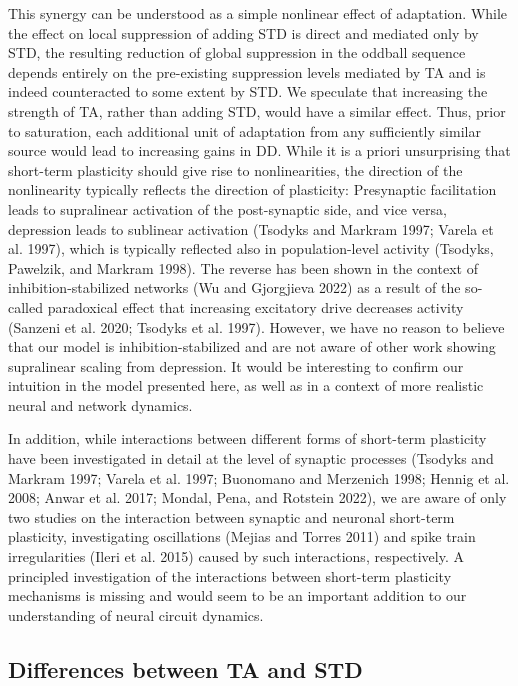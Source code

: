 \documentclass[pdflatex,referee,iicol,sn-basic]{sn-jnl}
\begin{document}
This synergy can be understood as a simple nonlinear effect of adaptation. While the effect on local suppression of adding STD is direct and mediated only by STD, the resulting reduction of global suppression in the oddball sequence depends entirely on the pre-existing suppression levels mediated by TA and is indeed counteracted to some extent by STD. We speculate that increasing the strength of TA, rather than adding STD, would have a similar effect. Thus, prior to saturation, each additional unit of adaptation from any sufficiently similar source would lead to increasing gains in DD. While it is a priori unsurprising that short-term plasticity should give rise to nonlinearities, the direction of the nonlinearity typically reflects the direction of plasticity: Presynaptic facilitation leads to supralinear activation of the post-synaptic side, and vice versa, depression leads to sublinear activation (Tsodyks and Markram 1997; Varela et al. 1997), which is typically reflected also in population-level activity (Tsodyks, Pawelzik, and Markram 1998). The reverse has been shown in the context of inhibition-stabilized networks (Wu and Gjorgjieva 2022) as a result of the so-called paradoxical effect that increasing excitatory drive decreases activity (Sanzeni et al. 2020; Tsodyks et al. 1997). However, we have no reason to believe that our model is inhibition-stabilized and are not aware of other work showing supralinear scaling from depression. It would be interesting to confirm our intuition in the model presented here, as well as in a context of more realistic neural and network dynamics.

In addition, while interactions between different forms of short-term plasticity have been investigated in detail at the level of synaptic processes (Tsodyks and Markram 1997; Varela et al. 1997; Buonomano and Merzenich 1998; Hennig et al. 2008; Anwar et al. 2017; Mondal, Pena, and Rotstein 2022), we are aware of only two studies on the interaction between synaptic and neuronal short-term plasticity, investigating oscillations (Mejias and Torres 2011) and spike train irregularities (Ileri et al. 2015) caused by such interactions, respectively. A principled investigation of the interactions between short-term plasticity mechanisms is missing and would seem to be an important addition to our understanding of neural circuit dynamics.

\subsection{Differences between TA and STD}
\end{document}
